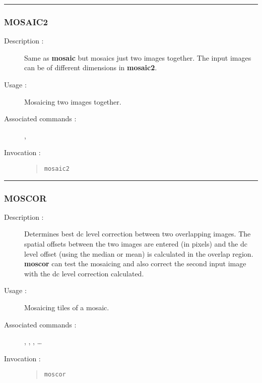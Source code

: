 \hrule
\subsubsection*{\label{MOSAIC2}MOSAIC2}

\begin{description}

\item[Description :] Same as {\bf mosaic} but mosaics just two images
together.  The input images can be of different dimensions in {\bf mosaic2}.

\item[Usage :] Mosaicing two images together.

\item[Associated commands :] {\tt {}},
{\tt {}}

\item[Invocation :]

\begin{quote}{\tt  mosaic2 }\end{quote}

\end{description}

\hrule
\subsubsection*{\label{MOSCOR}MOSCOR}

\begin{description}

\item[Description :] Determines best dc level correction between two
overlapping images. The spatial offsets between the two images are
entered (in pixels) and the dc level offset (using the median or mean)
is calculated in the overlap region.  {\bf moscor} can test the
mosaicing and also correct the second input image with the dc level
correction calculated.

\item[Usage :] Mosaicing tiles of a mosaic.

\item[Associated commands :] {\tt {}},
{\tt {}}, {\tt {}},
{\tt {}} \ldots

\item[Invocation :]

\begin{quote}{\tt  moscor }\end{quote}

\end{description}

